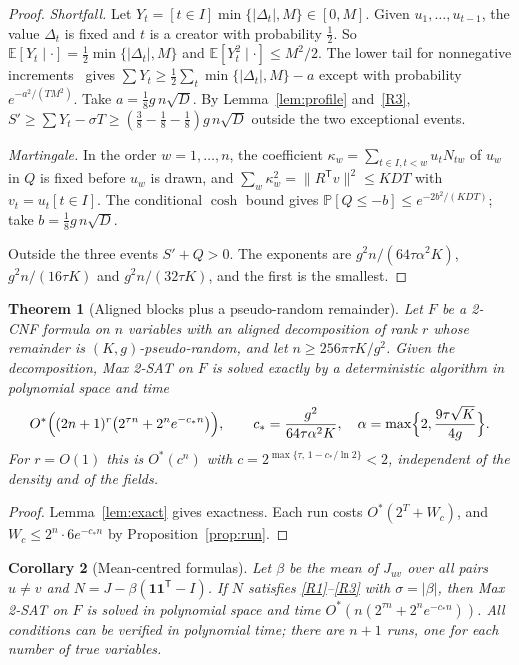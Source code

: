 \documentclass[11pt,a4paper]{article}
\newtheorem{theorem}{Theorem}
\newtheorem{corollary}[theorem]{Corollary}
\theoremstyle{definition}
\theoremstyle{remark}
\newcommand{\Ostar}{O^{*}}
\newcommand{\E}{\mathbb E}
\newcommand{\Prb}{\mathbb P}
\begin{document}
\begin{proof}
\emph{Shortfall.} Let $Y_t=[t\in I]\min\{|\Delta_t|,M\}\in[0,M]$. Given $u_1,\dots,u_{t-1}$,
the value $\Delta_t$ is fixed and $t$ is a creator with probability
$\frac12$. So $\E[Y_t\mid\cdot]=\frac12\min\{|\Delta_t|,M\}$ and
$\E[Y_t^2\mid\cdot]\le M^2/2$. The lower tail for nonnegative
increments~\cite{EE,Mau03} gives $\sum Y_t\ge\frac12\sum_t\min\{|\Delta_t|,M\}
-a$ except with probability $e^{-a^2/(TM^2)}$. Take $a=\frac18g\,n\sqrt D$.
By Lemma~\ref{lem:profile} and~\eqref{R3},
$S'\ge\sum Y_t-\sigma T\ge(\frac38-\frac18-\frac18)g\,n\sqrt D$ outside the
two exceptional events.

\emph{Martingale.} In the order $w=1,\dots,n$, the coefficient
$\kappa_w=\sum_{t\in I,t<w}u_tN_{tw}$ of $u_w$ in $Q$ is fixed before $u_w$
is drawn, and $\sum_w\kappa_w^2=\|R^{\mathsf T}v\|^2\le KDT$ with
$v_t=u_t[t\in I]$. The conditional $\cosh$ bound gives
$\Prb[Q\le-b]\le e^{-2b^2/(KDT)}$; take $b=\frac18g\,n\sqrt D$.

Outside the three events $S'+Q>0$. The exponents are $g^2n/(64\tau\alpha^2K)$,
$g^2n/(16\tau K)$ and $g^2n/(32\tau K)$, and the first is the smallest.
\end{proof}

\begin{theorem}[Aligned blocks plus a pseudo-random remainder]\label{thm:main}
Let $F$ be a 2-CNF formula on $n$ variables with an aligned decomposition of
rank $r$ whose remainder is $(K,g)$-pseudo-random, and let
$n\ge256\pi\tau K/g^2$. Given the decomposition, Max 2-SAT on $F$ is solved
exactly by a deterministic algorithm in polynomial space and time
\[
 \Ostar\Bigl((2n+1)^r\bigl(2^{\tau n}+2^ne^{-c_*n}\bigr)\Bigr),
 \qquad c_*=\frac{g^2}{64\tau\alpha^2K},\quad
 \alpha=\max\Bigl\{2,\frac{9\tau\sqrt K}{4g}\Bigr\}.
\]
For $r=O(1)$ this is $\Ostar(c^n)$ with $c=2^{\max\{\tau,\,1-c_*/\ln2\}}<2$,
independent of the density and of the fields.
\end{theorem}

\begin{proof}
Lemma~\ref{lem:exact} gives exactness. Each run costs
$\Ostar(2^T+W_c)$, and $W_c\le2^n\cdot6e^{-c_*n}$ by
Proposition~\ref{prop:run}.
\end{proof}

\begin{corollary}[Mean-centred formulas]\label{cor:mean}
Let $\beta$ be the mean of $J_{uv}$ over all pairs $u\ne v$ and
$N=J-\beta(\mathbf 1\mathbf 1^{\mathsf T}-I)$. If $N$ satisfies
\eqref{R1}--\eqref{R3} with $\sigma=|\beta|$, then Max 2-SAT on $F$ is solved
in polynomial space and time $\Ostar(n(2^{\tau n}+2^ne^{-c_*n}))$. All
conditions can be verified in polynomial time; there are $n+1$ runs, one for
each number of true variables.
\end{corollary}
\end{document}
